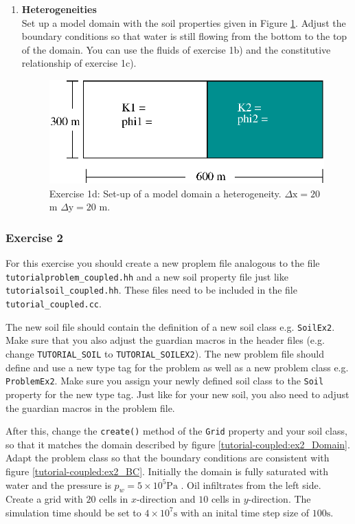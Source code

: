 \begin{enumerate}
\item \textbf{Heterogeneities}  \\
  Set up a model domain with the soil properties given in Figure
  \ref{tutorial-coupled:exercise1_d}. Adjust the boundary conditions
  so that water is still flowing from the bottom to the top of the
  domain. You can use the fluids of exercise 1b) and the constitutive
  relationship of exercise 1c).

\begin{figure}[h]
\centering
\includegraphics[width=0.5\linewidth,keepaspectratio]{EPS/exercise1_c.eps}
\caption{Exercise 1d: Set-up of a model domain a heterogeneity. $\Delta \text{x} = 20$ m $\Delta \text{y} = 20$ m.}\label{tutorial-coupled:exercise1_d}
\end{figure}

\end{enumerate}

\subsubsection{Exercise 2}
For this exercise you should create a new proplem file analogous to
the file \texttt{tutorialproblem\_coupled.hh} and a new soil property
file just like \texttt{tutorialsoil\_coupled.hh}. These files need to
be included in the file \texttt{tutorial\_coupled.cc}. 

The new soil file should contain the definition of a new soil class
e.g. \texttt{SoilEx2}. Make sure that you also adjust the guardian
macros in the header files (e.g. change \texttt{TUTORIAL\_SOIL} to
\texttt{TUTORIAL\_SOILEX2}).  The new problem file should define and
use a new type tag for the problem as well as a new problem class
e.g. \texttt{ProblemEx2}. Make sure you assign your newly defined soil
class to the \texttt{Soil} property for the new type tag. Just like
for your new soil, you also need to adjust the guardian macros in the
problem file.

After this, change the \texttt{create()} method of the \texttt{Grid}
property and your soil class, so that it matches the domain described
by figure \ref{tutorial-coupled:ex2_Domain}. Adapt the problem class
so that the boundary conditions are consistent with figure
\ref{tutorial-coupled:ex2_BC}. Initially the domain is fully saturated
with water and the pressure is $p_w = 5 \times 10^5 \text{Pa}$ . Oil
infiltrates from the left side. Create a grid with $20$ cells in
$x$-direction and $10$ cells in $y$-direction. The simulation time
should be set to $4\times 10^7 \text{s}$ with an inital time step size of
$100 \text{s}$.

